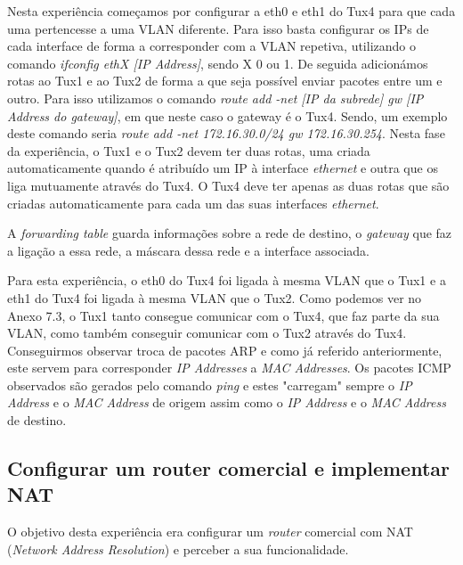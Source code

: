 \documentclass[a4paper]{article}
\begin{document}
Nesta experiência começamos por configurar a eth0 e eth1 do Tux4 para que cada uma pertencesse a uma VLAN diferente. Para isso basta configurar os IPs de cada interface de forma a corresponder com a VLAN repetiva, utilizando o comando \textit{ifconfig ethX [IP Address]}, sendo X 0 ou 1. De seguida adicionámos rotas ao Tux1 e ao Tux2 de forma a que seja possível enviar pacotes entre um e outro. Para isso utilizamos o comando \textit{route add -net [IP da subrede] gw [IP Address do gateway]}, em que neste caso o gateway é o Tux4. Sendo, um exemplo deste comando seria \textit{route add -net 172.16.30.0/24 gw 172.16.30.254}. Nesta fase da experiência, o Tux1 e o Tux2 devem ter duas rotas, uma criada automaticamente quando é atribuído um IP à interface \textit{ethernet} e outra que os liga mutuamente através do Tux4. O Tux4 deve ter apenas as duas rotas que são criadas automaticamente para cada um das suas interfaces \textit{ethernet}.

A \textit{forwarding table} guarda informações sobre a rede de destino, o \textit{gateway} que faz a ligação a essa rede, a máscara dessa rede e a interface associada.

Para esta experiência, o eth0 do Tux4 foi ligada à mesma VLAN que o Tux1 e a eth1 do Tux4 foi ligada à mesma VLAN que o Tux2. Como podemos ver no Anexo 7.3, o Tux1 tanto consegue comunicar com o Tux4, que faz parte da sua VLAN, como também conseguir comunicar com o Tux2 através do Tux4. Conseguirmos observar troca de pacotes ARP e como já referido anteriormente, este servem para corresponder \textit{IP Addresses} a \textit{MAC Addresses}. Os pacotes ICMP observados são gerados pelo comando \textit{ping} e estes "carregam" sempre o \textit{IP Address} e o \textit{MAC Address} de origem assim como o \textit{IP Address} e o \textit{MAC Address} de destino.

\subsection{Configurar um router comercial e implementar NAT}

O objetivo desta experiência era configurar um \textit{router} comercial com NAT (\textit{Network Address Resolution}) e perceber a sua funcionalidade.
\end{document}
